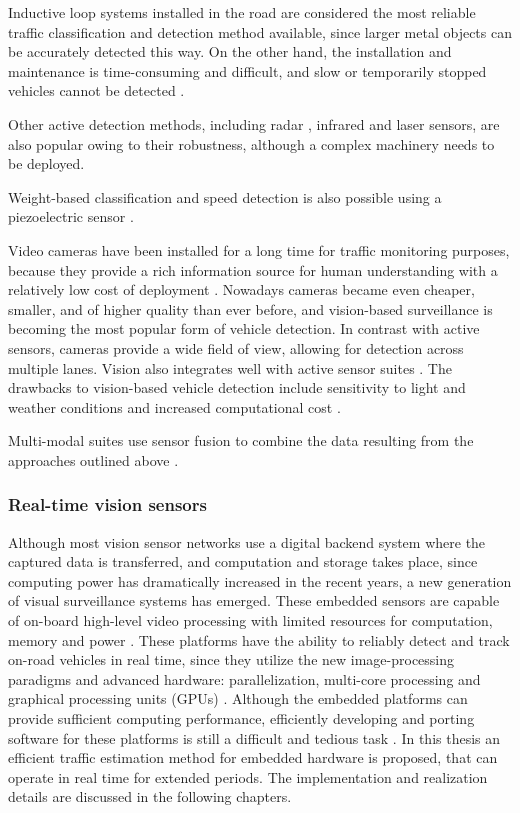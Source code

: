 Inductive loop systems installed in the road are considered the most reliable traffic classification and detection method available, since larger metal objects can be accurately detected this way. 
On the other hand, the installation and maintenance is time-consuming and difficult, and slow or temporarily stopped vehicles cannot be detected \cite{Diamond, Zhang2016}.

Other active detection methods, including radar \cite{DeepBlue}, infrared \cite{Swarco, Hussain1995, Ghazal2016} and laser \cite{SICK, Gallego2009} sensors, are also popular owing to their robustness, although a complex machinery needs to be deployed.

Weight-based classification and speed detection is also possible using a piezoelectric sensor \cite{Te, Rivas2017}.

Video cameras have been installed for a long time for traffic monitoring purposes, because they provide a rich information source for human understanding with a relatively low cost of deployment \cite{Tian2011, Buch2011, VideoSurveillance, LaSemaforica}.
Nowadays cameras became even cheaper, smaller, and of higher quality than ever before, and vision-based surveillance is becoming the most popular form of vehicle detection.
In contrast with active sensors, cameras provide a wide field of view, allowing for detection across multiple lanes. 
Vision also integrates well with active sensor suites \cite{Garcia2012}.
The drawbacks to vision-based vehicle detection include sensitivity to light and weather conditions and increased computational cost \cite{Sivaraman2013}.

Multi-modal suites use sensor fusion to combine the data resulting from the approaches outlined above \cite{Swarco}.

\subsubsection{Real-time vision sensors}
Although most vision sensor networks use a digital backend system where the captured data is transferred, and computation and storage takes place, since computing power has dramatically increased in the recent years, a new generation of visual surveillance systems has emerged.
These embedded sensors are capable of on-board high-level video processing with limited resources for computation, memory and power \cite{Bramberger2004}.
These platforms have the ability to reliably detect and track on-road vehicles in real time, since they utilize the new image-processing paradigms and advanced hardware: parallelization, multi-core processing and graphical processing units (GPUs) \cite{Sivaraman2013}.
Although the embedded platforms can provide sufficient computing performance, efficiently developing and porting software for these platforms is still a difficult and tedious task \cite{Bramberger2004}.
In this thesis an efficient traffic estimation method for embedded hardware is proposed, that can operate in real time for extended periods.
The implementation and realization details are discussed in the following chapters.

